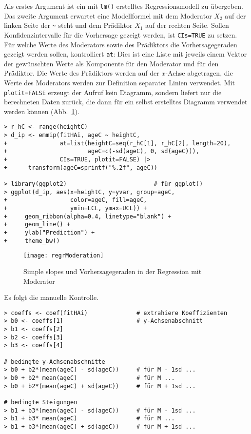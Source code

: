 Als erstes Argument ist ein mit \lstinline!lm()! erstelltes Regressionsmodell zu übergeben. Das zweite Argument erwartet eine Modellformel mit dem Moderator $X_{2}$ auf der linken Seite der \lstinline!~! steht und dem Prädiktor $X_{1}$ auf der rechten Seite. Sollen Konfidenzintervalle für die Vorhersage gezeigt werden, ist \lstinline!CIs=TRUE! zu setzen. Für welche Werte des Moderators sowie des Prädiktors die Vorhersagegeraden gezeigt werden sollen, kontrolliert \lstinline!at!: Dies ist eine Liste mit jeweils einem Vektor der gewünschten Werte als Komponente für den Moderator und für den Prädiktor. Die Werte des Prädiktors werden auf der $x$-Achse abgetragen, die Werte des Moderators werden zur Definition separater Linien verwendet. Mit \lstinline!plotit=FALSE! erzeugt der Aufruf kein Diagramm, sondern liefert nur die berechneten Daten zurück, die dann für ein selbst erstelltes Diagramm verwendet werden können (Abb.\ \ref{fig:regrModeration}).
\begin{lstlisting}
> r_hC <- range(heightC)
> d_ip <- emmip(fitHAi, ageC ~ heightC,
+               at=list(heightC=seq(r_hC[1], r_hC[2], length=20),
+                       ageC=c(-sd(ageC), 0, sd(ageC))),
+               CIs=TRUE, plotit=FALSE) |>
+      transform(ageC=sprintf("%.2f", ageC))

> library(ggplot2)                         # für ggplot()
> ggplot(d_ip, aes(x=heightC, y=yvar, group=ageC,
+                  color=ageC, fill=ageC,
+                  ymin=LCL, ymax=UCL)) +
+     geom_ribbon(alpha=0.4, linetype="blank") +
+     geom_line() +
+     ylab("Prediction") +
+     theme_bw()
\end{lstlisting}

\begin{figure}[ht]
\centering
\texttt{[image: regrModeration]}
\vspace*{-0.5em}
\caption{Simple slopes und Vorhersagegeraden in der Regression mit Moderator}
\label{fig:regrModeration}
\end{figure}

Es folgt die manuelle Kontrolle.
\begin{lstlisting}
> coeffs <- coef(fitHAi)              # extrahiere Koeffizienten
> b0 <- coeffs[1]                     # y-Achsenabschnitt
> b1 <- coeffs[2]
> b2 <- coeffs[3]
> b3 <- coeffs[4]

# bedingte y-Achsenabschnitte
> b0 + b2*(mean(ageC) - sd(ageC))     # für M - 1sd ...
> b0 + b2* mean(ageC)                 # für M ...
> b0 + b2*(mean(ageC) + sd(ageC))     # für M + 1sd ...

# bedingte Steigungen
> b1 + b3*(mean(ageC) - sd(ageC))     # für M - 1sd ...
> b1 + b3* mean(ageC)                 # für M ...
> b1 + b3*(mean(ageC) + sd(ageC))     # für M + 1sd ...
\end{lstlisting}

